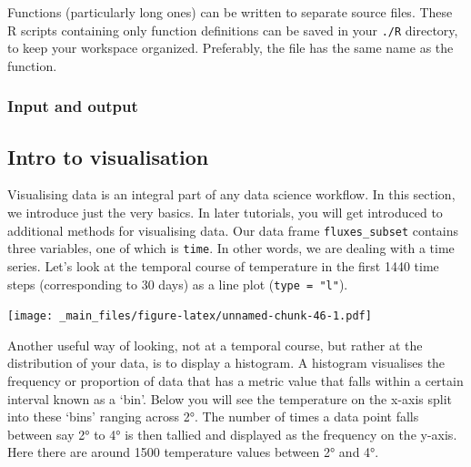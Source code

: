 \documentclass[
]{book}
\newenvironment{Shaded}{\begin{snugshade}}{\end{snugshade}}
\newcommand{\AttributeTok}[1]{\textcolor[rgb]{0.77,0.63,0.00}{#1}}
\newcommand{\DecValTok}[1]{\textcolor[rgb]{0.00,0.00,0.81}{#1}}
\newcommand{\FunctionTok}[1]{\textcolor[rgb]{0.00,0.00,0.00}{#1}}
\newcommand{\NormalTok}[1]{#1}
\newcommand{\SpecialCharTok}[1]{\textcolor[rgb]{0.00,0.00,0.00}{#1}}
\newcommand{\StringTok}[1]{\textcolor[rgb]{0.31,0.60,0.02}{#1}}
\begin{document}
Functions (particularly long ones) can be written to separate source files. These R scripts containing only function definitions can be saved in your \texttt{./R} directory, to keep your workspace organized. Preferably, the file has the same name as the function.

\hypertarget{input-and-output}{%
\subsubsection{Input and output}\label{input-and-output}}

\hypertarget{intro-to-visualisation}{%
\subsection{Intro to visualisation}\label{intro-to-visualisation}}

Visualising data is an integral part of any data science workflow. In this section, we introduce just the very basics. In later tutorials, you will get introduced to additional methods for visualising data. Our data frame \texttt{fluxes\_subset} contains three variables, one of which is \texttt{time}. In other words, we are dealing with a time series. Let's look at the temporal course of temperature in the first 1440 time steps (corresponding to 30 days) as a line plot (\texttt{type\ =\ "l"}).

\begin{Shaded}
\end{Shaded}

\texttt{[image: \_main\_files/figure-latex/unnamed-chunk-46-1.pdf]}

Another useful way of looking, not at a temporal course, but rather at the distribution of your data, is to display a histogram.
A histogram visualises the frequency or proportion of data that has a metric value that falls within a certain interval known as a `bin'. Below you will see the temperature on the x-axis split into these `bins' ranging across 2°. The number of times a data point falls between say 2° to 4° is then tallied and displayed as the frequency on the y-axis. Here there are around 1500 temperature values between 2° and 4°.
\end{document}
